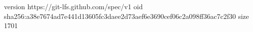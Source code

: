version https://git-lfs.github.com/spec/v1
oid sha256:a38e7674ad7e441d13605fc3daee2d73aef6e3690cef06c2a098ff36ac7c2f30
size 1701

